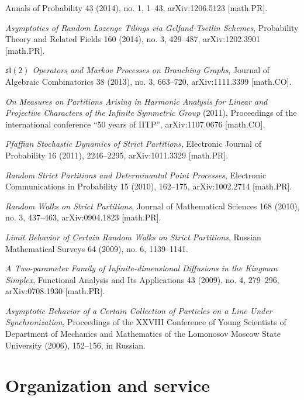 \documentclass[letterpaper,11pt]{article}
\begin{document}
\begin{etaremune}
	      Annals of Probability 43 (2014), no. 1, 1--43, arXiv:1206.5123
	      [math.PR].
	\item
	      \emph{Asymptotics of Random Lozenge Tilings via Gelfand-Tsetlin
		      Schemes},
	      Probability Theory and Related Fields 160 (2014), no. 3,
	      429--487, arXiv:1202.3901 [math.PR].
	\item
	      \emph{$\mathfrak{sl}(2)$
		      Operators and Markov Processes on Branching Graphs},
	      Journal of Algebraic Combinatorics 38 (2013), no. 3, 663--720,
	      arXiv:1111.3399 [math.CO].
	\item
	      \emph{On Measures on Partitions Arising in Harmonic Analysis for
		      Linear and Projective Characters of the Infinite Symmetric Group} (2011),
	      Proceedings of the international conference ``50 years of
	      IITP'', arXiv:1107.0676 [math.CO].
	\item
	      \emph{Pfaffian Stochastic Dynamics of Strict Partitions},
	      Electronic Journal of Probability 16 (2011), 2246--2295,
	      arXiv:1011.3329 [math.PR].
	\item
	      \emph{Random Strict Partitions and Determinantal Point
		      Processes},
	      Electronic Communications in Probability 15 (2010), 162--175,
	      arXiv:1002.2714 [math.PR].
	\item
	      \emph{Random Walks on Strict Partitions}, Journal of
	      Mathematical Sciences 168 (2010), no. 3, 437--463,
	      arXiv:0904.1823 [math.PR].
	\item
	      \emph{Limit Behavior of Certain Random Walks on Strict
		      Partitions},
	      Russian Mathematical Surveys 64 (2009), no. 6, 1139--1141.
	\item
	      \emph{A Two-parameter Family of Infinite-dimensional Diffusions
		      in the Kingman Simplex}, Functional Analysis and Its
	      Applications 43 (2009), no. 4, 279--296, arXiv:0708.1930
	      [math.PR].
	\item
	      \emph{Asymptotic Behavior of a Certain Collection of Particles
		      on a Line Under Synchronization}, Proceedings of the XXVIII
	      Conference of Young Scientists of Department of Mechanics and
	      Mathematics of the Lomonosov Moscow State University (2006), 152--156, in
	      Russian.
\end{etaremune}

\section*{Organization and service}
\end{document}
